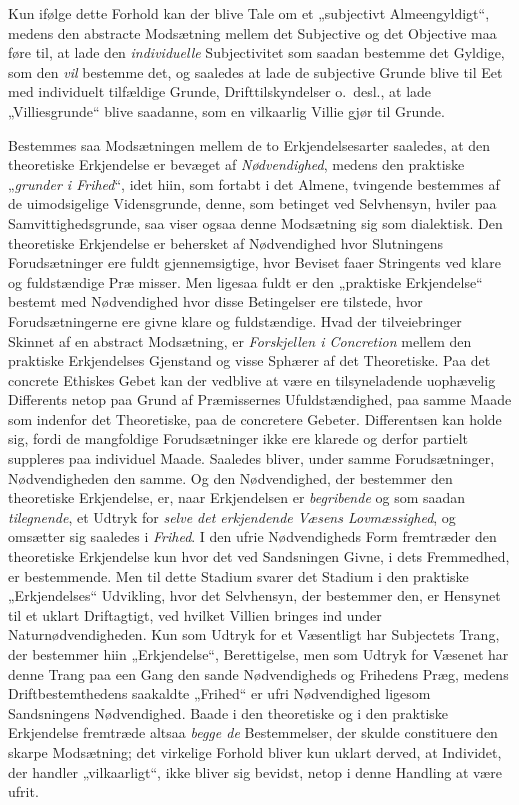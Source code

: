 Kun ifølge dette Forhold kan der blive Tale om et „subjectivt
Almeengyldigt“, medens den abstracte Modsætning mellem det Subjective og det
Objective maa føre til, at lade den \emph{individuelle} Subjectivitet som
saadan bestemme det Gyldige, som den \emph{vil} bestemme det, og saaledes at
lade de subjective Grunde blive til Eet med individuelt tilfældige Grunde,
Drifttilskyndelser o.\ desl., at lade „Villiesgrunde“ blive saadanne, som en
vilkaarlig Villie gjør til Grunde.

Bestemmes saa Modsætningen mellem de to Erkjendelsesarter saaledes, at den
theoretiske Erkjendelse er bevæget af \emph{Nødvendighed}, medens den
praktiske „\emph{grunder i Frihed}“, idet hiin, som fortabt i det Almene,
tvingende bestemmes af de uimodsigelige Vidensgrunde, denne, som betinget ved
Selvhensyn, hviler paa Samvittighedsgrunde, saa viser ogsaa denne Modsætning
sig som dialektisk. Den theoretiske Erkjendelse er behersket af Nødvendighed
hvor Slutningens Forudsætninger ere fuldt gjennemsigtige, hvor Beviset faaer
Stringents ved klare og fuldstændige Præ\-%
misser. Men ligesaa fuldt er den „praktiske Erkjendelse“ bestemt med
Nødvendighed hvor disse Betingelser ere tilstede, hvor Forudsætningerne ere
givne klare og fuldstændige. Hvad der tilveiebringer Skinnet af en abstract
Modsætning, er \emph{Forskjellen i Concretion} mellem den praktiske
Erkjendelses Gjenstand og visse Sphærer af det Theoretiske. Paa det concrete
Ethiskes Gebet kan der vedblive at være en tilsyneladende uophævelig
Differents netop paa Grund af Præmissernes Ufuldstændighed, paa samme Maade
som indenfor det Theoretiske, paa de concretere Gebeter. Differentsen kan
holde sig, fordi de mangfoldige Forudsætninger ikke ere klarede og derfor
partielt suppleres paa individuel Maade. Saaledes bliver, under samme
Forudsætninger, Nødvendigheden den samme. Og den Nødvendighed, der bestemmer
den theoretiske Erkjendelse, er, naar Erkjendelsen er \emph{begribende} og som
saadan \emph{tilegnende}, et Udtryk for \emph{selve det erkjendende Væsens
Lovmæssighed}, og omsætter sig saaledes i \emph{Frihed}. I den ufrie
Nødvendigheds Form fremtræder den theoretiske Erkjendelse kun hvor det ved
Sandsningen Givne, i dets Fremmedhed, er bestemmende. Men til dette Stadium
svarer det Stadium i den praktiske „Erkjendelses“ Udvikling, hvor det
Selvhensyn, der bestemmer den, er Hensynet til et uklart Driftagtigt, ved
hvilket Villien bringes ind under Naturnødvendigheden. Kun som Udtryk for et
Væsentligt har Subjectets Trang, der bestemmer hiin „Erkjendelse“,
Berettigelse, men som Udtryk for Væsenet har denne Trang paa een Gang den
sande Nødvendigheds og Frihedens Præg, medens Driftbestemthedens saakaldte
„Frihed“ er ufri Nødvendighed ligesom Sandsningens Nødvendighed. Baade i den
theoretiske og i den praktiske Erkjendelse fremtræde altsaa \emph{begge de}
Bestemmelser, der skulde constituere den skarpe Modsætning; det virkelige
Forhold bliver kun uklart derved, at Individet, der handler „vilkaarligt“,
ikke bliver sig bevidst, netop i denne Handling at være ufrit.

